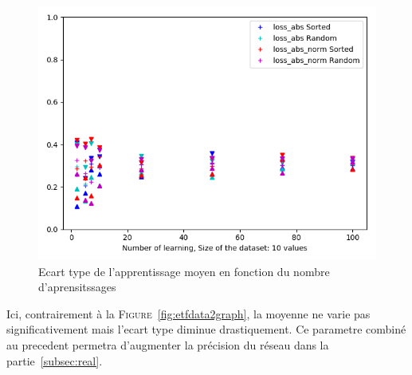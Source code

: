 \begin{figure}[H]
    \center
    \includegraphics[height=\moyen]{pict/appfn.png}
	\caption{Ecart type de l'apprentissage moyen en fonction du nombre d'aprensitssages}
	\label{fig:etfngraph1}
\end{figure}
\vspace{-5pt}
Ici, contrairement à la \textsc{Figure}\ \ref{fig:etfdata2graph}, la moyenne ne varie pas significativement mais l'ecart type diminue drastiquement.
Ce parametre combiné au precedent permetra d'augmenter la précision du réseau dans la partie\ \ref{subsec:real}.


